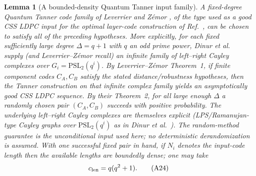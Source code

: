\documentclass[aps,prx,reprint,superscriptaddress,nofootinbib,floatfix,longbibliography]{revtex4-2}
\newtheorem{lemma}[theorem]{Lemma}
\theoremstyle{definition}
\begin{document}
\begin{lemma}[A bounded-density Quantum Tanner input family]
\label{lem:tanner-dense}
A fixed-degree Quantum Tanner code family of Leverrier and Z\'emor
\cite{LeverrierZemorTanner}, of the type used as a good CSS LDPC input for the
optimal layer-code construction of Ref.~\cite{WilliamsonBaspinLayerCodes},
can be chosen to satisfy all of the preceding hypotheses.  More explicitly,
for each fixed sufficiently large degree $\Delta=q+1$ with $q$ an odd prime
power, Dinur \emph{et al.}\ \cite{DinurLTC} supply (and Leverrier--Z\'emor
recall) an infinite family of left--right Cayley complexes over
$G_i=\mathrm{PSL}_2(q^i)$.  By Leverrier--Z\'emor Theorem~1, if finite
component codes $C_A,C_B$ satisfy the stated distance/robustness hypotheses,
then the Tanner construction on that infinite complex family yields an
asymptotically good CSS LDPC sequence.  By their Theorem~2, for all large
enough $\Delta$ a randomly chosen pair $(C_A,C_B)$ succeeds with positive
probability.  The underlying left--right Cayley complexes are themselves
explicit (LPS/Ramanujan-type Cayley graphs over $\mathrm{PSL}_2(q^i)$ as in
Dinur \emph{et al.}\ \cite{DinurLTC}).  The random-method guarantee is the unconditional input used here; no deterministic derandomization is assumed.  With one successful fixed pair in
hand, if $N_i$ denotes the input-code length then the available lengths are
boundedly dense; one may take
\begin{equation}
 c_{\rm len}=q(q^2+1).
 \tag{A24}
\end{equation}
\end{lemma}
\end{document}
